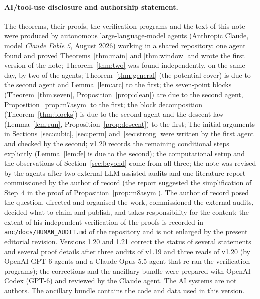 \documentclass[11pt]{article}
\theoremstyle{remark}
\begin{document}
\paragraph{AI/tool-use disclosure and authorship statement.}  The theorems, their proofs, the verification programs and
the text of this note were produced by autonomous large-language-model agents (Anthropic Claude, model \emph{Claude
Fable 5}, August 2026) working in a shared repository: one agent found and proved Theorems~\ref{thm:main} and
\ref{thm:window} and wrote the first version of the note; Theorem~\ref{thm:two} was found independently, on the same day, by two of
the agents; Theorem~\ref{thm:general} (the potential cover) is due to the second agent and Lemma~\ref{lem:arc} to the first; the seven-point blocks
(Theorem~\ref{thm:seven}, Proposition~\ref{prop:clean}) are due to the second agent, Proposition~\ref{prop:m7asym} to the first; the block
decomposition (Theorem~\ref{thm:blocks}) is due to the second agent and the descent law (Lemma~\ref{lem:run},
Proposition~\ref{prop:descent}) to the first;
The initial arguments in Sections~\ref{sec:cubic}, \ref{sec:perm} and~\ref{sec:strong} were written by the first agent and checked by the second; v1.20 records the remaining conditional steps explicitly (Lemma~\ref{lem:fe} is due to the second); the computational setup and the observations of
Section~\ref{sec:beyond} come from all three; the note was revised by
the agents after two external LLM-assisted audits and one literature report commissioned by the author of record (the report
suggested the simplification of Step~4 in the proof of Proposition~\ref{prop:m8asym}).  The author of record posed the question, directed and organised the work, commissioned the external
audits, decided what to claim and publish, and takes responsibility for the content; the extent of his independent
verification of the proofs is recorded in \texttt{anc/docs/HUMAN\_AUDIT.md} of the repository and is not enlarged by the present editorial revision.  Versions 1.20 and 1.21 correct the status of several statements and several proof details after three audits of v1.19 and three reads of v1.20 (by OpenAI GPT-6 agents and a Claude Opus 5.5 agent that re-ran the verification programs); the corrections and the ancillary bundle were prepared with OpenAI Codex (GPT-6) and reviewed by the Claude agent.  The AI systems are not authors.  The ancillary bundle contains the code and data used in this version.


\end{document}
